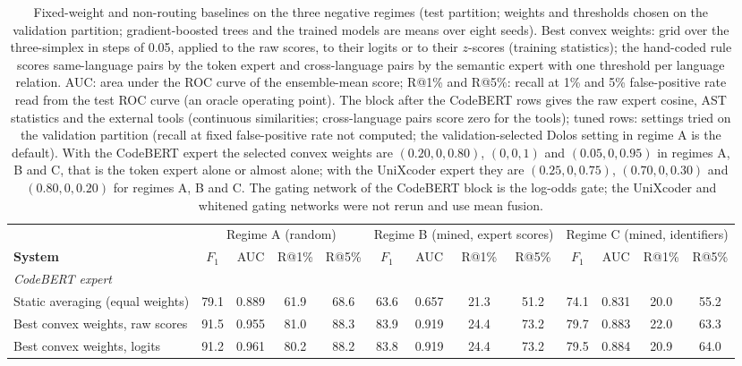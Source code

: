 \begin{table}[t]
\centering
\caption{Fixed-weight and non-routing baselines on the three negative regimes (test partition; weights and thresholds chosen on the validation partition; gradient-boosted trees and the trained models are means over eight seeds). Best convex weights: grid over the three-simplex in steps of 0.05, applied to the raw scores, to their logits or to their $z$-scores (training statistics); the hand-coded rule scores same-language pairs by the token expert and cross-language pairs by the semantic expert with one threshold per language relation. AUC: area under the ROC curve of the ensemble-mean score; R@1\% and R@5\%: recall at 1\% and 5\% false-positive rate read from the test ROC curve (an oracle operating point). The block after the CodeBERT rows gives the raw expert cosine, AST statistics and the external tools (continuous similarities; cross-language pairs score zero for the tools); tuned rows: settings tried on the validation partition (recall at fixed false-positive rate not computed; the validation-selected Dolos setting in regime A is the default). With the CodeBERT expert the selected convex weights are $(0.20,0,0.80)$, $(0,0,1)$ and $(0.05,0,0.95)$ in regimes A, B and C, that is the token expert alone or almost alone; with the UniXcoder expert they are $(0.25,0,0.75)$, $(0.70,0,0.30)$ and $(0.80,0,0.20)$ for regimes A, B and C. The gating network of the CodeBERT block is the log-odds gate; the UniXcoder and whitened gating networks were not rerun and use mean fusion.}
\label{tab:baselines-fixed}
\scriptsize
\setlength{\tabcolsep}{2.6pt}
\begin{tabular}{l|cccc|cccc|cccc}
\toprule
 & \multicolumn{4}{c|}{Regime A (random)} & \multicolumn{4}{c|}{Regime B (mined, expert scores)} & \multicolumn{4}{c}{Regime C (mined, identifiers)} \\
\textbf{System} & $F_1$ & AUC & R@1\% & R@5\% & $F_1$ & AUC & R@1\% & R@5\% & $F_1$ & AUC & R@1\% & R@5\% \\
\midrule
\multicolumn{13}{l}{\emph{CodeBERT expert}} \\
Static averaging (equal weights) & 79.1 & 0.889 & 61.9 & 68.6 & 63.6 & 0.657 & 21.3 & 51.2 & 74.1 & 0.831 & 20.0 & 55.2 \\
Best convex weights, raw scores & 91.5 & 0.955 & 81.0 & 88.3 & 83.9 & 0.919 & 24.4 & 73.2 & 79.7 & 0.883 & 22.0 & 63.3 \\
Best convex weights, logits & 91.2 & 0.961 & 80.2 & 88.2 & 83.8 & 0.919 & 24.4 & 73.2 & 79.5 & 0.884 & 20.9 & 64.0 \\

\end{tabular}
\end{table}
